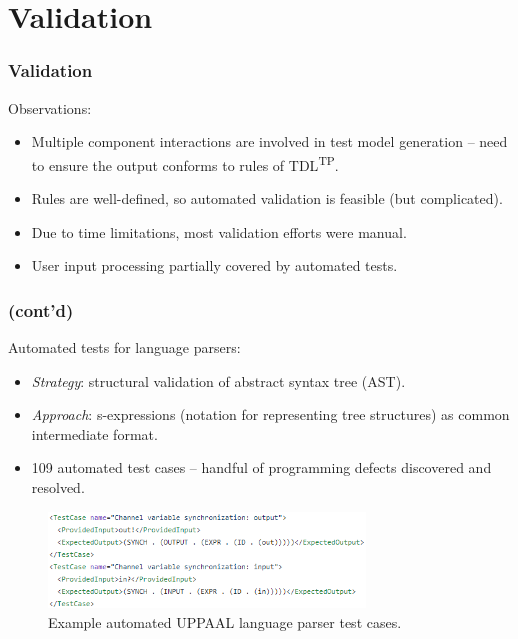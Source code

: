 \documentclass{beamer}
\makeatletter
\def\grenewcommand{\g@star@or@long\renew@command}
\def\g@star@or@long#1{%
      \@ifstar{\let\l@ngrel@x\global#1}{\def\l@ngrel@x{\long\global}#1}}
\newcommand{\recallframetitle}{}
\newcommand{\storeframetitle}[1]{%
    \grenewcommand{\recallframetitle}{#1}%
}
\newcommand{\frametitlestore}[1]{
    \frametitle{#1}%
    \storeframetitle{#1}%
}
\newcommand{\frametitlecont}{%
    \frametitle{\recallframetitle{} (cont'd)}%
}
\newcommand{\pauseafteritemize}{\pause[\thebeamerpauses]}
\newcommand{\TDLTP}{\texorpdfstring{TDL\textsuperscript{TP}}{TDL(TP)}}
\makeatother
\begin{document}
    \section{Validation}
    \begin{frame}
        \frametitlestore{Validation}
        \par Observations:
        \pause
        \begin{itemize}[<+->]
            \item Multiple component interactions are involved in test model generation -- need to ensure the output conforms to rules of \TDLTP{}.
            \item Rules are well-defined, so automated validation is feasible (but complicated).
            \item Due to time limitations, most validation efforts were manual.
            \item User input processing partially covered by automated tests.
        \end{itemize}
    \end{frame}

    \begin{frame}
        \frametitlecont{}
        \par Automated tests for language parsers:
        \pause
        \begin{itemize}[<+->]
            \item \textit{Strategy}: structural validation of abstract syntax tree (AST).
            \item \textit{Approach}: s-expressions (notation for representing tree structures) as common intermediate format.
            \item 109 automated test cases -- handful of programming defects discovered and resolved.
        \end{itemize}
        \pauseafteritemize
        \begin{figure}
            \includegraphics[width=0.75\textwidth]{images/presentation/AutomatedParserTestCase.png}
            \caption{Example automated UPPAAL language parser test cases.}
            \label{fig:uta_parser_test_case}
        \end{figure}
    \end{frame}
\end{document}
